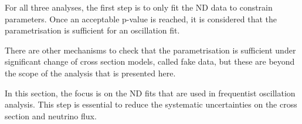 For all three analyses, the first step is to only fit the \Gls{ND}
data to constrain parameters. Once an acceptable p-value is reached,
it is considered that the parametrisation is sufficient for an
oscillation fit.

There are other mechanisms to check that the parametrisation is
sufficient under significant change of cross section models, called
fake data, but these are beyond the scope of the analysis that is
presented here.

In this section, the focus is on the \Gls{ND} fits that are used in
frequentist oscillation analysis. This step is essential to reduce the
systematic uncertainties on the cross section and neutrino flux.




